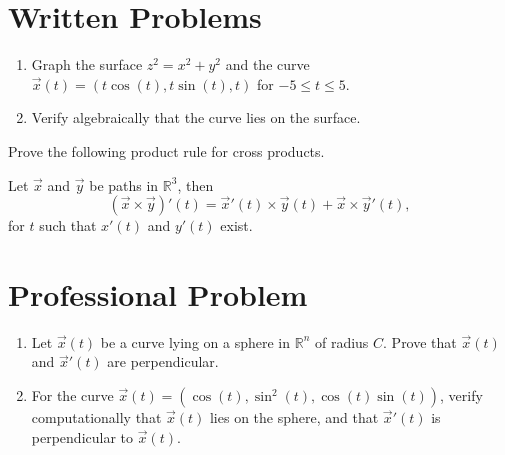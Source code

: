 \documentclass{ximera}
\begin{document}
\section*{Written Problems}
\begin{problem}
\begin{enumerate}
\item Graph the surface $z^2 = x^2 +y^2$ and the curve $\vec{x}(t) = (t\cos(t), t\sin(t), t)$ for $-5\leq t\leq 5$.
\item Verify algebraically that the curve lies on the surface.
\end{enumerate}
\end{problem}

\begin{problem}
Prove the following product rule for cross products.

Let $\vec{x}$ and $\vec{y}$ be paths in $\mathbb{R}^3$, then 
\[
(\vec{x}\times\vec{y})'(t) = \vec{x}'(t)\times\vec{y}(t) + \vec{x}\times\vec{y}'(t),
\]
for $t$ such that $x'(t)$ and $y'(t)$ exist.
\end{problem}

\section*{Professional Problem}

\begin{problem}
\begin{enumerate}
\item Let $\vec{x}(t)$ be a curve lying on a sphere in $\mathbb{R}^n$ of radius $C$. Prove that $\vec{x}(t)$ and $\vec{x}'(t)$ are perpendicular. 
\item For the curve $\vec{x}(t) = (\cos(t), \sin^2(t), \cos(t)\sin(t))$, verify computationally that $\vec{x}(t)$ lies on the sphere, and that $\vec{x}'(t)$ is perpendicular to $\vec{x}(t)$.
\end{enumerate}
\end{problem}
\end{document}
